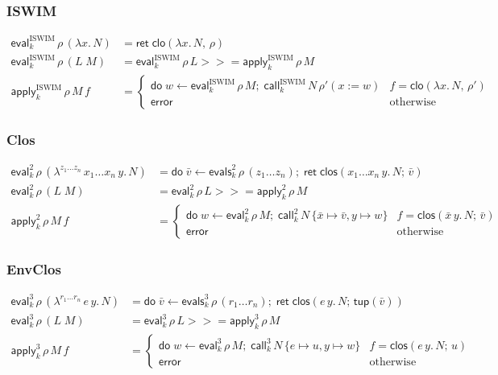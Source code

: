 \documentclass[10pt]{article}
\theoremstyle{acmplain}
\newcommand{\key}[1]{\mathsf{#1}}
\newcommand{\lam}[1]{\lambda #1.\,}
\newcommand{\clos}[2]{\lambda^{#1}\, #2.\,}
\newcommand{\ext}[3]{#1(#2{:=}#3)}
\newcommand{\error}{\key{error}}
\newcommand{\cloV}[2]{\key{clo}(#1,\, #2)}
\newcommand{\closV}[2]{\key{clos}(#1;\, #2)}
\newcommand{\tupV}[1]{\key{tup}(#1)}
\newcommand{\Ret}{\key{ret}\;}
\newcommand{\bind}{\mathbin{>\!\!>\!\!=}}
\newcommand{\Do}{\key{do}\;}
\newcommand{\EV}[2]{\key{eval}^{#1}_{#2}}
\newcommand{\EVS}[2]{\key{evals}^{#1}_{#2}}
\newcommand{\APP}[2]{\key{apply}^{#1}_{#2}}
\newcommand{\CALL}[2]{\key{call}^{#1}_{#2}}
\begin{document}
\subsubsection{ISWIM}

\begin{align*}
  \EV{\mathrm{ISWIM}}{k}\,\rho\,(\lam{x} N) &= \Ret \cloV{\lam{x} N}{\rho} \\
  \EV{\mathrm{ISWIM}}{k}\,\rho\,(L\;M) &= \EV{\mathrm{ISWIM}}{k}\,\rho\,L \bind \APP{\mathrm{ISWIM}}{k}\,\rho\,M \\[1ex]
  \APP{\mathrm{ISWIM}}{k}\,\rho\,M\,f &=
    \begin{cases}
      \Do w \leftarrow \EV{\mathrm{ISWIM}}{k}\,\rho\,M;\; \CALL{\mathrm{ISWIM}}{k}\,N\,\ext{\rho'}{x}{w}
        & f = \cloV{\lam{x} N}{\rho'} \\
      \error & \text{otherwise}
    \end{cases}
\end{align*}

\subsubsection{Clos}

\begin{align*}
  \EV{2}{k}\,\rho\,(\clos{z_1 \ldots z_n}{x_1 \ldots x_n\, y} N) &=
    \Do \bar{v} \leftarrow \EVS{2}{k}\,\rho\,(z_1 \ldots z_n);\; \Ret \closV{x_1 \ldots x_n\, y.\, N}{\bar{v}} \\
  \EV{2}{k}\,\rho\,(L\;M) &= \EV{2}{k}\,\rho\,L \bind \APP{2}{k}\,\rho\,M \\[1ex]
  \APP{2}{k}\,\rho\,M\,f &=
    \begin{cases}
      \Do w \leftarrow \EV{2}{k}\,\rho\,M;\; \CALL{2}{k}\,N\,\{\bar{x} {\mapsto} \bar{v}, y {\mapsto} w\}
        & f = \closV{\bar{x}\, y.\, N}{\bar{v}} \\
      \error & \text{otherwise}
    \end{cases}
\end{align*}

\subsubsection{EnvClos}

\begin{align*}
  \EV{3}{k}\,\rho\,(\clos{r_1 \ldots r_n}{e\, y} N) &=
    \Do \bar{v} \leftarrow \EVS{3}{k}\,\rho\,(r_1 \ldots r_n);\; \Ret \closV{e\, y.\, N}{\tupV{\bar{v}}} \\
  \EV{3}{k}\,\rho\,(L\;M) &= \EV{3}{k}\,\rho\,L \bind \APP{3}{k}\,\rho\,M \\[1ex]
  \APP{3}{k}\,\rho\,M\,f &=
    \begin{cases}
      \Do w \leftarrow \EV{3}{k}\,\rho\,M;\; \CALL{3}{k}\,N\,\{e {\mapsto} u, y {\mapsto} w\}
        & f = \closV{e\, y.\, N}{u} \\
      \error & \text{otherwise}
    \end{cases}
\end{align*}
\end{document}
